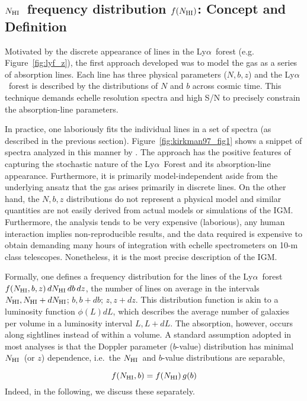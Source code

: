 \documentclass[graybox]{svmult}
\def\lya{Ly$\alpha$}
\newcommand{\mnhi}{N_{\rm HI}}
\newcommand{\nhi}{$\mnhi$}
\def\mfnhi{f(\mnhi)}
\def\fnhi{$\mfnhi$}
\begin{document}
\subsection{\nhi\ frequency distribution \fnhi: Concept and Definition}

Motivated by the discrete appearance of lines in the 
\lya\ forest (e.g. Figure~\ref{fig:lyf_z}), the
first approach developed was to model the gas
as a series of absorption lines.  Each line has
three physical parameters ($N,b,z$) and 
the \lya\ forest is described by the distributions of
$N$ and $b$ across cosmic time.  This technique demands
echelle resolution spectra and high S/N to precisely 
constrain the absorption-line parameters.

In practice, one laboriously fits the individual lines in a set of
spectra (as described in the previous section).  
Figure~\ref{fig:kirkman97_fig1} shows a snippet of spectra
analyzed in this manner by \cite{kt97}.  The approach has the
positive features of 
capturing the stochastic nature of the \lya\ Forest and
its absorption-line appearance.  Furthermore, it is 
primarily model-independent aside from the underlying
ansatz that the gas arises primarily in discrete lines.
On the other hand, the $N,b,z$ distributions do not
represent a physical model and similar quantities are not
easily derived from actual models or simulations of the IGM.
Furthermore, the analysis tends to 
be very expensive (laborious), any
human interaction implies non-reproducible results,
and the data required is expensive to obtain
demanding many hours of integration with 
echelle spectrometers on 10-m class telescopes.
Nonetheless, it is the most precise description of the IGM.

Formally, one defines a frequency distribution for the
lines of the \lya\ forest
$f(\mnhi, b, z) \, d\mnhi \, db \, dz $, the number of lines on
average in the intervals $\mnhi, \mnhi+d\mnhi$; $b, b+db$; $z, z+dz$.
This distribution function is
akin to a luminosity function $\phi(L) dL$, which describes
the average number of galaxies per volume in a luminosity interval $L, L+dL$.
The absorption, however, occurs along 
sightlines instead of within a volume.  
A standard assumption adopted in most analyses is that
the Doppler parameter ($b$-value) distribution has 
minimal \nhi\ (or $z$) dependence, i.e.\ the \nhi\ and $b$-value
distributions are separable,

\begin{equation}
f(\mnhi,b) = \mfnhi \, g(b)
\end{equation}
Indeed, in the following, we discuss these separately.
\end{document}
